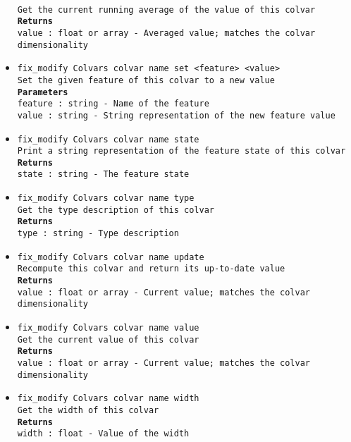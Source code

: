 \begin{itemize}
\\
\texttt{Get the current running average of the value of this colvar}
\\
\texttt{\textbf{Returns}}
\\
\texttt{value : float or array - Averaged value; matches the colvar dimensionality}
\item \texttt{fix\_modify Colvars colvar name set <feature> <value>}
\\
\texttt{Set the given feature of this colvar to a new value}
\\
\texttt{\textbf{Parameters}}
\\
\texttt{feature : string - Name of the feature}
\\
\texttt{value : string - String representation of the new feature value}
\item \texttt{fix\_modify Colvars colvar name state}
\\
\texttt{Print a string representation of the feature state of this colvar}
\\
\texttt{\textbf{Returns}}
\\
\texttt{state : string - The feature state}
\item \texttt{fix\_modify Colvars colvar name type}
\\
\texttt{Get the type description of this colvar}
\\
\texttt{\textbf{Returns}}
\\
\texttt{type : string - Type description}
\item \texttt{fix\_modify Colvars colvar name update}
\\
\texttt{Recompute this colvar and return its up-to-date value}
\\
\texttt{\textbf{Returns}}
\\
\texttt{value : float or array - Current value; matches the colvar dimensionality}
\item \texttt{fix\_modify Colvars colvar name value}
\\
\texttt{Get the current value of this colvar}
\\
\texttt{\textbf{Returns}}
\\
\texttt{value : float or array - Current value; matches the colvar dimensionality}
\item \texttt{fix\_modify Colvars colvar name width}
\\
\texttt{Get the width of this colvar}
\\
\texttt{\textbf{Returns}}
\\
\texttt{width : float - Value of the width}
\end{itemize}
